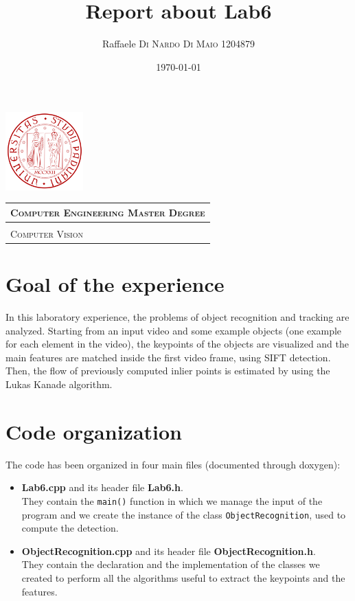 \documentclass{article}
\title{\textbf{Report about Lab6}} %
\author{Raffaele \textsc{Di Nardo Di Maio} 1204879} %
\date{\today}
\begin{document}
\begin{minipage}{.20\textwidth}
  \includegraphics[height=3cm]{../Icon4}
\end{minipage}\begin{minipage}{.20\textwidth}
  \begin{table}[H]
  \begin{tabular}{l}
  \scshape{\Large{Computer Engineering Master Degree}} \\
  \hline \\
  \scshape{\Large{Computer Vision}} \\
  \end{tabular}
  \end{table}
\end{minipage}
{\let\newpage\relax\maketitle}

\section{Goal of the experience}
In this laboratory experience, the problems of object recognition and tracking are analyzed. Starting from an input video and some example objects (one example for each element in the video), the keypoints of the objects are visualized and the main features are matched inside the first video frame, using SIFT detection.\\
Then, the flow of previously computed inlier points is estimated by using the Lukas Kanade algorithm.

\section{Code organization}
The code has been organized in four main files (documented through doxygen):
\begin{itemize}
\item{\textbf{Lab6.cpp} and its header file \textbf{Lab6.h}.\\
They contain the \texttt{main()} function in which we manage the input of the program and we create the instance of the class \texttt{ObjectRecognition}, used to compute the detection.}
\item{\textbf{ObjectRecognition.cpp} and its header file \textbf{ObjectRecognition.h}.\\
They contain the declaration and the implementation of the classes we created to perform all the algorithms useful to extract the keypoints and the features.}
\end{itemize}
\end{document}
